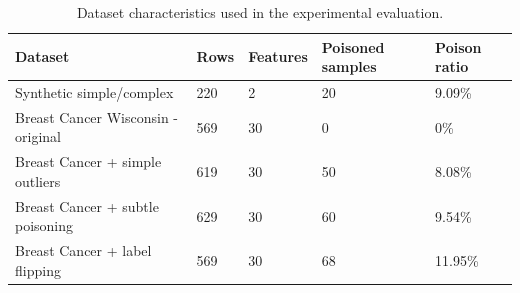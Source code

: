 \begin{table}[H]
\centering
\caption{Dataset characteristics used in the experimental evaluation.}
\label{tab:dataset_description}
\begin{tabular}{lllll}
\hline
Dataset & Rows & Features & Poisoned samples & Poison ratio \\
\hline
Synthetic simple/complex & 220 & 2 & 20 & 9.09\% \\
Breast Cancer Wisconsin - original & 569 & 30 & 0 & 0\% \\
Breast Cancer + simple outliers & 619 & 30 & 50 & 8.08\% \\
Breast Cancer + subtle poisoning & 629 & 30 & 60 & 9.54\% \\
Breast Cancer + label flipping & 569 & 30 & 68 & 11.95\% \\
\hline
\end{tabular}
\end{table}
